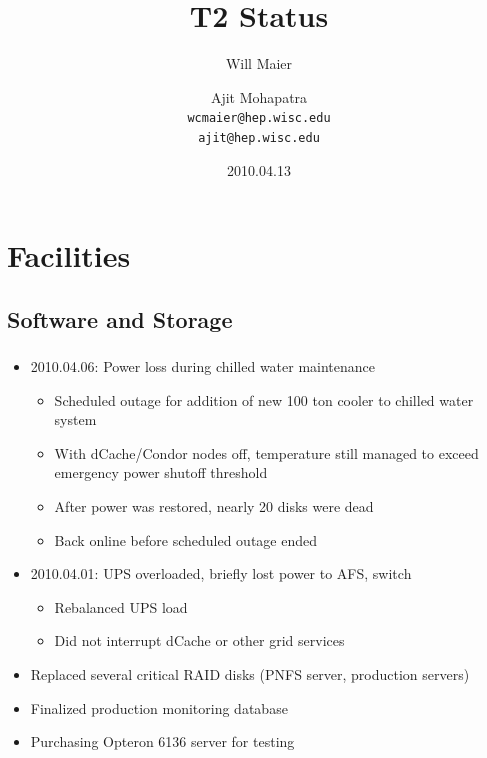\documentclass{beamer}
\title{T2 Status}
\author[Maier, Mohapatra]{
    Will Maier \and Ajit Mohapatra\\
    {\tt wcmaier@hep.wisc.edu}\\
    {\tt ajit@hep.wisc.edu}}
\institute[Wisconsin]{University of Wisconsin - High Energy Physics}
\date{2010.04.13}
\begin{document}
\begin{frame}
    \titlepage
\end{frame}


\section{Facilities}
\subsection{Software and Storage}
\begin{frame}
\frametitle{}

\begin{itemize}
	\item 2010.04.06: Power loss during chilled water maintenance
	\begin{itemize}
		\item Scheduled outage for addition of new 100 ton cooler to chilled water system
		\item With dCache/Condor nodes off, temperature still managed to exceed emergency power shutoff threshold
		\item After power was restored, nearly 20 disks were dead
		\item Back online before scheduled outage ended
	\end{itemize}
	\item 2010.04.01: UPS overloaded, briefly lost power to AFS, switch 
	\begin{itemize}
		\item Rebalanced UPS load
		\item Did not interrupt dCache or other grid services
	\end{itemize}
	\item Replaced several critical RAID disks (PNFS server, production servers)
	\item Finalized production monitoring database
	\item Purchasing Opteron 6136 server for testing
\end{itemize}
\end{frame}
\end{document}
